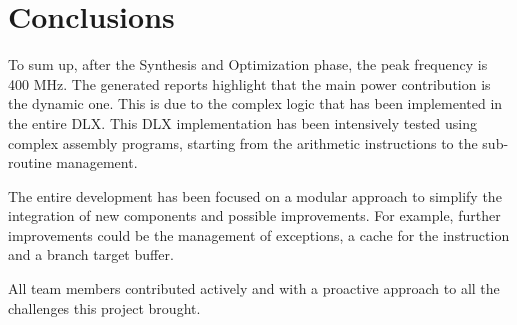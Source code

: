 \chapter{Conclusions}
To sum up, after the Synthesis and Optimization phase, the peak frequency is 400 MHz. The generated reports highlight that the main power contribution is the dynamic one. This is due to the complex logic that has been implemented in the entire DLX. This DLX implementation has been intensively tested using complex assembly programs, starting from the arithmetic instructions to the sub-routine management.

The entire development has been focused on a modular approach to simplify the integration of new components and possible improvements. For example, further improvements could be the management of exceptions, a cache for the instruction and a branch target buffer.

All team members contributed actively and with a proactive approach to all the challenges this project brought. 